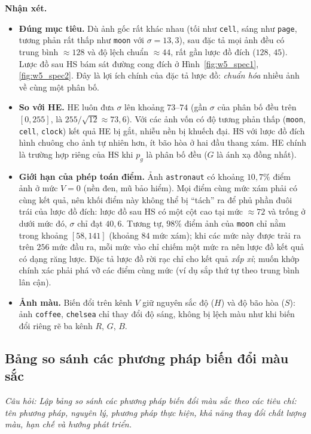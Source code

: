 \textbf{Nhận xét.}
\begin{itemize}
    \item \textbf{Đúng mục tiêu.} Dù ảnh gốc rất khác nhau (tối như \texttt{cell}, sáng như \texttt{page}, tương phản rất thấp như \texttt{moon} với $\sigma = 13{,}3$), sau đặc tả mọi ảnh đều có trung bình $\approx 128$ và độ lệch chuẩn $\approx 44$, rất gần lược đồ đích ($128$, $45$). Lược đồ sau HS bám sát đường cong đích ở Hình~\ref{fig:w5_spec1}, \ref{fig:w5_spec2}. Đây là lợi ích chính của đặc tả lược đồ: \emph{chuẩn hóa} nhiều ảnh về cùng một phân bố.
    \item \textbf{So với HE.} HE luôn đưa $\sigma$ lên khoảng $73$--$74$ (gần $\sigma$ của phân bố đều trên $[0, 255]$, là $255/\sqrt{12} \approx 73{,}6$). Với các ảnh vốn có độ tương phản thấp (\texttt{moon}, \texttt{cell}, \texttt{clock}) kết quả HE bị gắt, nhiễu nền bị khuếch đại. HS với lược đồ đích hình chuông cho ảnh tự nhiên hơn, ít bão hòa ở hai đầu thang xám. HE chính là trường hợp riêng của HS khi $p_g$ là phân bố đều ($G$ là ánh xạ đồng nhất).
    \item \textbf{Giới hạn của phép toán điểm.} Ảnh \texttt{astronaut} có khoảng $10{,}7\%$ điểm ảnh ở mức $V = 0$ (nền đen, mũ bảo hiểm). Mọi điểm cùng mức xám phải có cùng kết quả, nên khối điểm này không thể bị ``tách'' ra để phủ phần đuôi trái của lược đồ đích: lược đồ sau HS có một cột cao tại mức $\approx 72$ và trống ở dưới mức đó, $\sigma$ chỉ đạt $40{,}6$. Tương tự, $98\%$ điểm ảnh của \texttt{moon} chỉ nằm trong khoảng $[58, 141]$ (khoảng $84$ mức xám); khi các mức này được trải ra trên $256$ mức đầu ra, mỗi mức vào chỉ chiếm một mức ra nên lược đồ kết quả có dạng răng lược. Đặc tả lược đồ rời rạc chỉ cho kết quả \emph{xấp xỉ}; muốn khớp chính xác phải phá vỡ các điểm cùng mức (ví dụ sắp thứ tự theo trung bình lân cận).
    \item \textbf{Ảnh màu.} Biến đổi trên kênh $V$ giữ nguyên sắc độ ($H$) và độ bão hòa ($S$): ảnh \texttt{coffee}, \texttt{chelsea} chỉ thay đổi độ sáng, không bị lệch màu như khi biến đổi riêng rẽ ba kênh $R$, $G$, $B$.
\end{itemize}

\subsection{Bảng so sánh các phương pháp biến đổi màu sắc}
\label{subsec:w5_table}

\textit{Câu hỏi: Lập bảng so sánh các phương pháp biến đổi màu sắc theo các tiêu chí: tên phương pháp, nguyên lý, phương pháp thực hiện, khả năng thay đổi chất lượng màu, hạn chế và hướng phát triển.}

